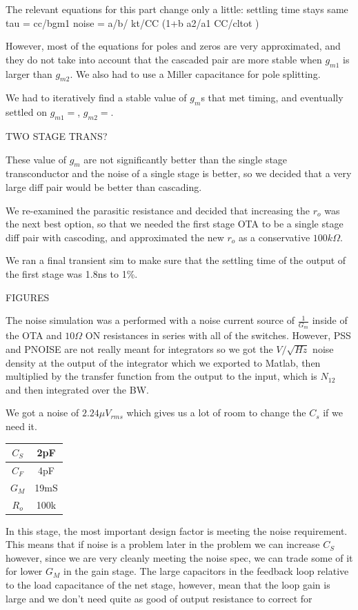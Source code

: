 \documentclass[conference]{IEEEtran}
\begin{document}
The relevant equations for this part change only a little:
settling time stays same tau = cc/bgm1
noise = a/b/ kt/CC (1+b a2/a1 CC/cltot )

However, most of the equations for poles and zeros are very approximated, and they do not take into account that the cascaded pair are more stable when $g_{m1}$ is larger than $g_{m2}$. We also had to use a Miller capacitance for pole splitting.

We had to iteratively find a stable value of $g_m$s that met timing, and eventually settled on $g_{m1}=$, $g_{m2}=$.

TWO STAGE TRANS?

These value of $g_m$ are not significantly better than the single stage transconductor and the noise of a single stage is better, so we decided that a very large diff pair would be better than cascading.

We re-examined the parasitic resistance and decided that increasing the $r_o$ was the next best option, so that we needed the first stage OTA to be a single stage diff pair with cascoding, and approximated the new $r_o$ as a conservative $100k\Omega$.

We ran a final transient sim to make sure that the settling time of the output of the first stage was 1.8ns to 1\%. 

FIGURES

The noise simulation was a performed with a noise current source of $\frac{1}{G_m}$ inside of the OTA and $10\Omega$ ON resistances in series with all of the switches. However, PSS and PNOISE are not really meant for integrators so we got the $V/\sqrt{Hz}$ noise density at the output of the integrator which we exported to Matlab, then multiplied by the transfer function from the output to the input, which is $N_{12}$ and then integrated over the BW.

We got a noise of $2.24\mu V_{rms}$ which gives us a lot of room to change the $C_s$ if we need it.

\begin{center}
\begin{tabular}{|c|c|} 
\hline
$C_S$ & 2pF \\
\hline
$C_F$ & 4pF \\
\hline
$G_M$ & 19mS \\
\hline
$R_o$ & 100k \\
\hline
\end{tabular}
\end{center}

In this stage, the most important design factor is meeting the noise requirement. This means that if noise is a problem later in the problem we can increase $C_S$ however, since we are very cleanly meeting the noise spec, we can trade some of it for lower $G_M$ in the gain stage. The large capacitors in the feedback loop relative to the load capacitance of the net stage, however, mean that the loop gain is large and we don't need quite as good of output resistance to correct for 
\end{document}
